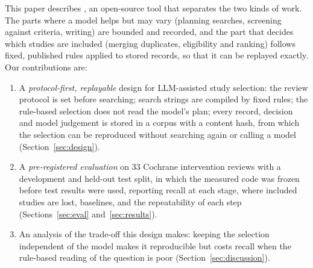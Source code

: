 This paper describes \tool{}, an open-source tool that separates the two kinds of work. The parts where a model
helps but may vary (planning searches, screening against criteria, writing) are bounded and recorded, and the part
that decides which studies are included (merging duplicates, eligibility and ranking) follows fixed, published
rules applied to stored records, so that it can be replayed exactly. Our contributions are:
\begin{enumerate}
\item A \emph{protocol-first, replayable} design for LLM-assisted study selection: the review protocol is set
  before searching; search strings are compiled by fixed rules; the rule-based selection does not read the model's
  plan; every record, decision and model judgement is stored in a corpus with a content hash, from which the
  selection can be reproduced without searching again or calling a model (Section~\ref{sec:design}).
\item A \emph{pre-registered evaluation} on 33 Cochrane intervention reviews with a development and held-out test
  split, in which the measured code was frozen before test results were used, reporting recall at each stage,
  where included studies are lost, baselines, and the repeatability of each step (Sections~\ref{sec:eval}
  and~\ref{sec:results}).
\item An analysis of the trade-off this design makes: keeping the selection independent of the model makes it
  reproducible but costs recall when the rule-based reading of the question is poor
  (Section~\ref{sec:discussion}).
\end{enumerate}
